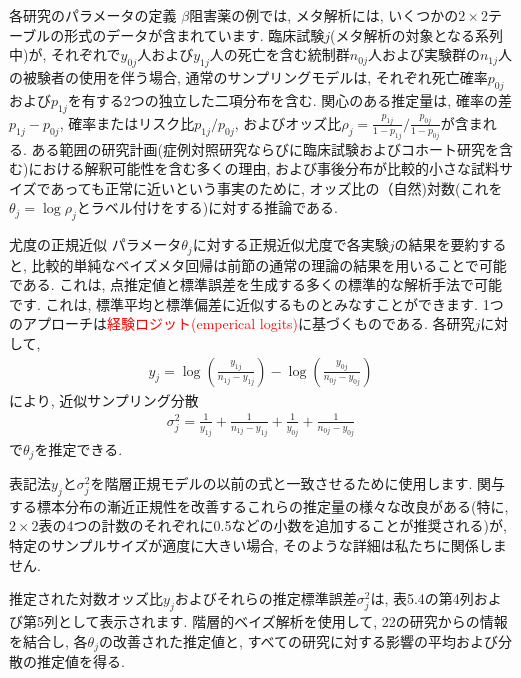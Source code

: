 \documentclass[10pt,dvipdfmx,a4]{beamer}
\newcommand{\eq}[1]{\begin{align}#1\end{align}}
\newcommand{\tcr}[1]{\textcolor{red}{#1}}
\begin{document}

\begin{frame}{各研究のパラメータの定義}
$\beta$阻害薬の例では, メタ解析には, いくつかの$2\times 2$テーブルの形式のデータが含まれています.
臨床試験$j$(メタ解析の対象となる系列中)が, それぞれで$y_{0j}$人および$y_{1j}$人の死亡を含む統制群$n_{0j}$人および実験群の$n_{1j}$人の被験者の使用を伴う場合, 通常のサンプリングモデルは, それぞれ死亡確率$p_{0j}$および$p_{1j}$を有する2つの独立した二項分布を含む.
関心のある推定量は, 確率の差$p_{1j}-p_{0j}$, 確率またはリスク比$p_{1j}/p_{0j}$, およびオッズ比$\rho_j=\tfrac{p_{1j}}{1-p_{1j}}/\tfrac{p_{0j}}{1-p_{0j}}$が含まれる.
ある範囲の研究計画(症例対照研究ならびに臨床試験およびコホート研究を含む)における解釈可能性を含む多くの理由, および事後分布が比較的小さな試料サイズであっても正常に近いという事実のために, オッズ比の（自然)対数(これを$\theta_j=\log\rho_j$とラベル付けをする)に対する推論である.
\end{frame}


\begin{frame}{尤度の正規近似}
パラメータ$\theta_j$に対する正規近似尤度で各実験$j$の結果を要約すると, 比較的単純なベイズメタ回帰は前節の通常の理論の結果を用いることで可能である.
これは, 点推定値と標準誤差を生成する多くの標準的な解析手法で可能です.
これは, 標準平均と標準偏差に近似するものとみなすことができます.
1つのアプローチは\tcr{経験ロジット(emperical logits)}に基づくものである.
各研究$j$に対して, 
\eq{y_j=\log \left(\frac{y_{1j}}{n_{1j}-y_{1j}}\right)-\log \left(\frac{y_{0j}}{n_{0j}-y_{0j}}\right)}
により, 近似サンプリング分散
\eq{\sigma_j^2=\frac{1}{y_{1j}}+\frac{1}{n_{1j}-y_{1j}}+\frac{1}{y_{0j}}+\frac{1}{n_{0j}-y_{0j}}}
で$\theta_j$を推定できる.
\end{frame}


\begin{frame}
表記法$y_j$と$\sigma^2_j$を階層正規モデルの以前の式と一致させるために使用します.
関与する標本分布の漸近正規性を改善するこれらの推定量の様々な改良がある(特に, $2\times2$表の4つの計数のそれぞれに0.5などの小数を追加することが推奨される)が, 特定のサンプルサイズが適度に大きい場合, そのような詳細は私たちに関係しません.

推定された対数オッズ比$y_j$およびそれらの推定標準誤差$\sigma^2_j$は, 表5.4の第4列および第5列として表示されます.
階層的ベイズ解析を使用して, 22の研究からの情報を結合し, 各$\theta_j$の改善された推定値と, すべての研究に対する影響の平均および分散の推定値を得る.
\end{frame}
\end{document}
